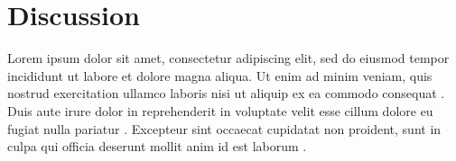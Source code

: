 \chapter{Discussion}
\label{chap:discussion}

Lorem ipsum dolor sit amet, consectetur adipiscing elit, sed do eiusmod tempor incididunt ut labore et dolore magna aliqua. Ut enim ad minim veniam, quis nostrud exercitation ullamco laboris nisi ut aliquip ex ea commodo consequat \cite{ref1}. Duis aute irure dolor in reprehenderit in voluptate velit esse cillum dolore eu fugiat nulla pariatur \cite{ref2}. Excepteur sint occaecat cupidatat non proident, sunt in culpa qui officia deserunt mollit anim id est laborum \cite{ref3}.

